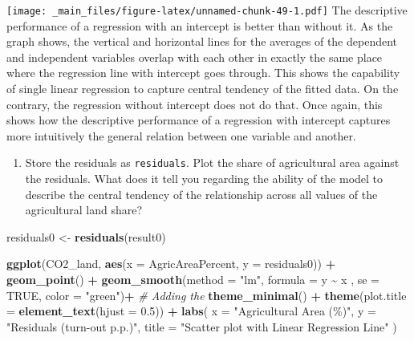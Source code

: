 \documentclass[
]{book}
\newenvironment{Shaded}{\begin{snugshade}}{\end{snugshade}}
\newcommand{\AttributeTok}[1]{\textcolor[rgb]{0.13,0.29,0.53}{#1}}
\newcommand{\CommentTok}[1]{\textcolor[rgb]{0.56,0.35,0.01}{\textit{#1}}}
\newcommand{\ConstantTok}[1]{\textcolor[rgb]{0.56,0.35,0.01}{#1}}
\newcommand{\FloatTok}[1]{\textcolor[rgb]{0.00,0.00,0.81}{#1}}
\newcommand{\FunctionTok}[1]{\textcolor[rgb]{0.13,0.29,0.53}{\textbf{#1}}}
\newcommand{\NormalTok}[1]{#1}
\newcommand{\OtherTok}[1]{\textcolor[rgb]{0.56,0.35,0.01}{#1}}
\newcommand{\SpecialCharTok}[1]{\textcolor[rgb]{0.81,0.36,0.00}{\textbf{#1}}}
\newcommand{\StringTok}[1]{\textcolor[rgb]{0.31,0.60,0.02}{#1}}
\providecommand{\tightlist}{%
  \setlength{\itemsep}{0pt}\setlength{\parskip}{0pt}}
\begin{document}
\texttt{[image: \_main\_files/figure-latex/unnamed-chunk-49-1.pdf]}
The descriptive performance of a regression with an intercept is better than without it. As the graph shows, the vertical and horizontal lines for the averages of the dependent and independent variables overlap with each other in exactly the same place where the regression line with intercept goes through. This shows the capability of single linear regression to capture central tendency of the fitted data. On the contrary, the regression without intercept does not do that. Once again, this shows how the descriptive performance of a regression with intercept captures more intuitively the general relation between one variable and another.

\begin{enumerate}
\def\labelenumi{\roman{enumi}.}
\setcounter{enumi}{11}
\tightlist
\item
  Store the residuals as \texttt{residuals}. Plot the share of agricultural area against the residuals. What does it tell you regarding the ability of the model to describe the central tendency of the relationship across all values of the agricultural land share?
\end{enumerate}

\begin{Shaded}
\begin{Highlighting}[]
\NormalTok{residuals0 }\OtherTok{\textless{}{-}} \FunctionTok{residuals}\NormalTok{(result0)}

\FunctionTok{ggplot}\NormalTok{(CO2\_land, }\FunctionTok{aes}\NormalTok{(}\AttributeTok{x =}\NormalTok{ AgricAreaPercent, }\AttributeTok{y =}\NormalTok{ residuals0)) }\SpecialCharTok{+}
  \FunctionTok{geom\_point}\NormalTok{() }\SpecialCharTok{+}
  \FunctionTok{geom\_smooth}\NormalTok{(}\AttributeTok{method =} \StringTok{"lm"}\NormalTok{, }\AttributeTok{formula =}\NormalTok{ y }\SpecialCharTok{\textasciitilde{}}\NormalTok{ x , }\AttributeTok{se =} \ConstantTok{TRUE}\NormalTok{, }\AttributeTok{color =} \StringTok{"green"}\NormalTok{)}\SpecialCharTok{+}  \CommentTok{\# Adding the}
  \FunctionTok{theme\_minimal}\NormalTok{() }\SpecialCharTok{+}
  \FunctionTok{theme}\NormalTok{(}\AttributeTok{plot.title =} \FunctionTok{element\_text}\NormalTok{(}\AttributeTok{hjust =} \FloatTok{0.5}\NormalTok{)) }\SpecialCharTok{+}
  \FunctionTok{labs}\NormalTok{(}
    \AttributeTok{x =} \StringTok{"Agricultural Area (\%)"}\NormalTok{,}
    \AttributeTok{y =} \StringTok{"Residuals (turn{-}out p.p.)"}\NormalTok{,}
    \AttributeTok{title =} \StringTok{"Scatter plot with Linear Regression Line"}
\NormalTok{  )}
\end{Highlighting}
\end{Shaded}
\end{document}
